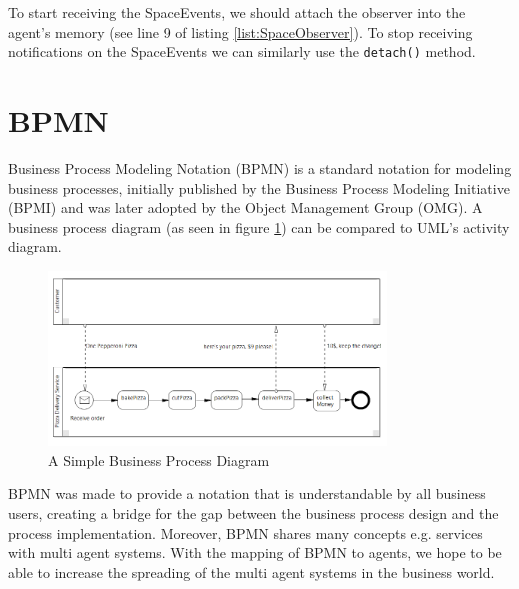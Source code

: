 To start receiving the SpaceEvents, we should attach the observer into the agent's memory (see line 9 of listing \ref{list:SpaceObserver}). To stop receiving notifications on the SpaceEvents we can similarly use the \texttt{detach()} method.

\section{BPMN}
Business Process Modeling Notation (BPMN) \cite{BPMN2} is a standard notation for modeling business processes, initially published by the Business Process Modeling Initiative (BPMI) and was later adopted by the Object Management Group (OMG). A business process diagram (as seen in figure \ref{fig:bpmn_sampl}) can be compared to UML's activity diagram.\\
\begin{figure}[h]
	\centering
		\includegraphics[width=0.80\textwidth]{images/bpmn_sampl.png}
	\caption{A Simple Business Process Diagram}
	\label{fig:bpmn_sampl}
\end{figure}

BPMN was made to provide a notation that is understandable by all business users, creating a bridge for the gap between the business process design and the process implementation. Moreover, BPMN shares many concepts e.g. services with multi agent systems. With the mapping of BPMN to agents, we hope to be able to increase the spreading of the multi agent systems in the business world.


